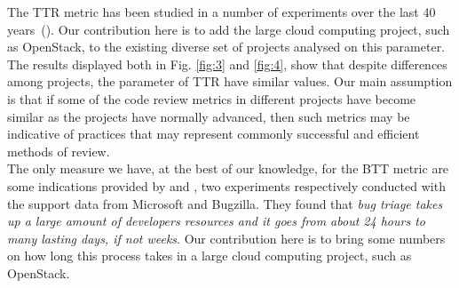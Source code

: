 \documentclass[10pt, conference]{IEEEtran}
\begin{document}
The TTR metric has been studied in a number of experiments over the
last 40 years~(\cite{bib05,bib03,bib023}). 
Our contribution here is to add the large cloud computing project, such as OpenStack, 
to the existing diverse set of projects analysed on this parameter.
\\
The results displayed both in Fig. \ref{fig:3} and \ref{fig:4}, show that 
despite differences among projects, the parameter of TTR have similar values.
Our main assumption is that if some of the code review metrics  
in different projects have become similar as the projects have  
normally advanced, then such metrics may be indicative of  
practices that may represent commonly successful and efficient  
methods of review.
\\
The only measure we have, at the best of our knowledge, for the BTT metric are some indications 
provided by \cite{bib024} and \cite{bib025}, two experiments respectively conducted with the support 
data from Microsoft and Bugzilla. They found that 
\emph{bug triage takes up a large amount of developers resources and it goes from about 24 hours to 
many lasting days, if not weeks}. Our contribution here is to bring some numbers on how long this process 
takes in a large cloud computing project, such as OpenStack.
\end{document}
